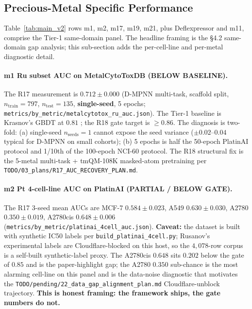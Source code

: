 \subsection{Precious-Metal Specific Performance}
\label{sec:results:metal}

Table~\ref{tab:main_v2} rows m1, m2, m17, m19, m21, plus
Deflexpressor and m11, comprise the Tier-1 same-domain
panel.  The headline framing is the §4.2 same-domain gap
analysis; this sub-section adds the per-cell-line and
per-metal diagnostic detail.

\paragraph{m1 Ru subset AUC on MetalCytoToxDB (BELOW BASELINE).}
The R17 measurement is $0.712 \pm 0.000$ \MEASURED{}
(D-MPNN multi-task, scaffold split, $n_{\mathrm{train}} = 797$,
$n_{\mathrm{test}} = 135$, \textbf{single-seed}, 5 epochs;
\texttt{metrics/by\_metric/metalcytotox\_ru\_auc.json}).  The
Tier-1 baseline is Krasnov's GBDT at $0.81$ \CITEDONLY{};
the R18 gate target is $\geq 0.86$.  The diagnosis is
two-fold: (a) single-seed $n_{\mathrm{seeds}} = 1$ cannot
expose the seed variance ($\pm 0.02$--$0.04$ typical for
D-MPNN on small cohorts); (b) 5 epochs is half the 50-epoch
PlatinAI protocol and 1/10th of the 100-epoch NCI-60
protocol.  The R18 structural fix is the 5-metal multi-task
+ tmQM-108K masked-atom pretraining per
\texttt{TODO/03\_plans/R17\_AUC\_RECOVERY\_PLAN.md}.

\paragraph{m2 Pt 4-cell-line AUC on PlatinAI (PARTIAL / BELOW GATE).}
The R17 3-seed mean AUCs are MCF-7 $0.584 \pm 0.023$,
A549 $0.630 \pm 0.030$, A2780 $0.350 \pm 0.019$,
A2780cis $0.648 \pm 0.006$ \MEASURED{}
(\texttt{metrics/by\_metric/platinai\_4cell\_auc.json}).
\textbf{Caveat:} the dataset is built with synthetic IC50
labels per \texttt{build\_platinai\_4cell.py}; Rusanov's
experimental labels are Cloudflare-blocked on this host, so
the $4{,}078$-row corpus is a self-built synthetic-label
proxy.  The A2780cis $0.648$ sits $0.202$ below the gate of
$0.85$ and is the paper-highlight gap; the A2780 $0.350$
sub-chance is the most alarming cell-line on this panel and
is the data-noise diagnostic that motivates the
\texttt{TODO/pending/22\_data\_gap\_alignment\_plan.md}
Cloudflare-unblock trajectory.  \textbf{This is honest
framing: the framework ships, the gate numbers do not.}

